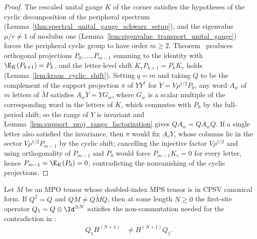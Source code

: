 \begin{proof}
    \leanok
    The rescaled unital gauge $K$ of the corner satisfies the hypotheses of
    the cyclic decomposition of the peripheral spectrum
    (Lemma~\ref{thm:spectral_unital_gauge_schwarz_setup}), and the
    eigenvalue $\mu/r\ne 1$ of modulus one
    (Lemma~\ref{lem:eigenvalue_transport_unital_gauge}) forces the
    peripheral cyclic group to have order $m\ge 2$.
    Theorem~\cite[``Cyclic decomposition for irreducible finite Kraus maps'']{QICLean2026Blueprint} produces
    orthogonal projections $P_0,\ldots,P_{m-1}$ summing to the identity
    with $\E_K(P_{k+1})=P_k$, and the letter-level shift
    $K_vP_{k+1}=P_kK_v$ holds
    (Lemma~\ref{lem:kraus_cyclic_shift}). Setting $q=m$ and taking $Q$ to be the
    complement of the support projection $\pi$ of
    $YY^\dagger$ for $Y=V\rho^{1/2}P_0$, any word $A_w$ of $m$ letters of
    $\widetilde M$ satisfies $A_wY=YG_w$, where $G_w$ is a scalar multiple
    of the corresponding word in the letters of $K$, which commutes with
    $P_0$ by the full-period shift; so the range of $Y$ is invariant and
    Lemma~\ref{lem:support_proj_range_factorization} gives
    $QA_w=QA_wQ$. If a single letter also satisfied the invariance, then
    $\pi$ would fix $A_vY$, whose columns lie in the sector
    $V\rho^{1/2}P_{m-1}$ by the cyclic shift; cancelling the injective
    factor $V\rho^{1/2}$ and using orthogonality of $P_{m-1}$ and $P_0$
    would force $P_{m-1}K_v=0$ for every letter, hence
    $P_{m-1}=\E_K(P_0)=0$, contradicting the nonvanishing of the cyclic
    projections.
\end{proof}

\begin{lemma}
    \label{thm:cpsv_literal_displaced_noncommutation}
    \leanok
    Let $M$ be an MPO tensor whose doubled-index MPS tensor is in
    CPSV canonical form. If $Q^2=Q$ and
    $Q\widetilde M\ne Q\widetilde M Q$, then at some length $N\geq0$ the
    first-site operator $Q_1=Q\otimes\Id^{\otimes N}$ satisfies the
    non-commutation needed for the contradiction in
    \cite[Proposition~4.13, lines~1888--1893]{Cirac2016MPDO_arXiv}:
    \begin{align}
        Q_1H^{(N+1)} & \ne H^{(N+1)}Q_1.
        \label{eq:cpsv_literal_displaced_noncommutation}
    \end{align}
\end{lemma}

